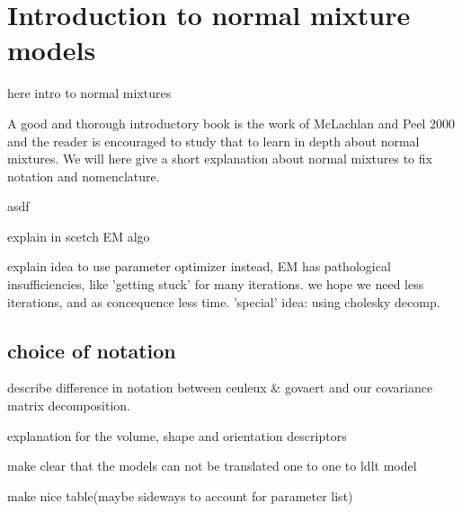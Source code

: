\chapter{Introduction to normal mixture models}%

here intro to normal mixtures

A good and thorough introductory book is the work of McLachlan and Peel 2000 and
the reader is encouraged to study that to learn in depth about normal mixtures. 
We will here give a short explanation about normal mixtures to fix notation and nomenclature.

\begin{definition}
	asdf
\end{definition}

explain in scetch EM algo

explain idea to use parameter optimizer instead,
EM has pathological insufficiencies, like 'getting stuck' for many iterations.
we hope we need less iterations, and as concequence less time.
'special' idea: using cholesky decomp.


\section{choice of notation}

describe difference in notation between ceuleux \& govaert and our covariance matrix decomposition.

explanation for the volume, shape and orientation descriptors

make clear that the models can not be translated one to one to ldlt model

make nice table(maybe sideways to account for parameter list)


